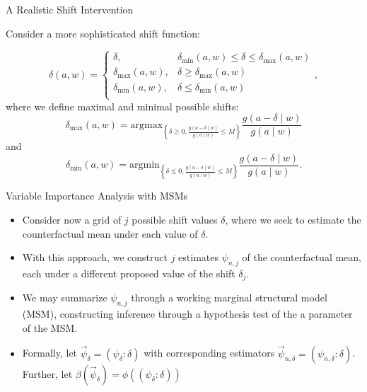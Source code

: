 \documentclass{beamer}
\begin{document}
\begin{frame}[c]{A Realistic Shift Intervention}

\begin{center}

Consider a more sophisticated shift function:

\begin{equation*}
  \delta(a, w) =
    \begin{cases}
      \delta, & \delta_{\text{min}}(a,w) \leq \delta \leq
        \delta_{\text{max}}(a,w) \\
      \delta_{\text{max}}(a,w), & \delta \geq \delta_{\text{max}}(a,w) \\
      \delta_{\text{min}}(a,w), & \delta \leq \delta_{\text{min}}(a,w) \\
    \end{cases},
\end{equation*}
where we define maximal and minimal possible shifts:
$$\delta_{\text{max}}(a, w) = \text{argmax}_{\left\{\delta \geq 0,
\frac{g(a - \delta \mid w)}{g(a \mid w)} \leq M \right\}} \frac{g(a - \delta
\mid w)}{g(a \mid w)}$$ and
$$\delta_{\text{min}}(a, w) = \text{argmin}_{\left\{\delta \leq 0,
\frac{g(a - \delta \mid w)}{g(a \mid w)} \leq M \right\}} \frac{g(a - \delta
\mid w)}{g(a \mid w)}.$$
\end{center}

\note{
}

\end{frame}


\begin{frame}[c]{Variable Importance Analysis with MSMs}

\begin{center}
\begin{itemize}
  \itemsep10pt
  \item Consider now a grid of $j$ possible shift values $\delta$, where we seek
    to estimate the counterfactual mean under each value of $\delta$.
  \item With this approach, we construct $j$ estimates $\psi_{n,j}$ of the
    counterfactual mean, each under a different proposed value of the shift
    $\delta_j$.
  \item We may summarize $\psi_{n,j}$ through a working marginal structural
    model (MSM), constructing inference through a hypothesis test of the a
    parameter of the MSM.
  \item Formally, let $\vec{\psi}_{\delta} = (\psi_{\delta}: \delta)$ with
    corresponding estimators $\vec{\psi}_{n, \delta} = (\psi_{n, \delta}:
    \delta)$. Further, let $\beta(\vec{\psi}_{\delta}) = \phi((\psi_{\delta}:
    \delta))$
\end{itemize}
\end{center}

\note{
}

\end{frame}
\end{document}
